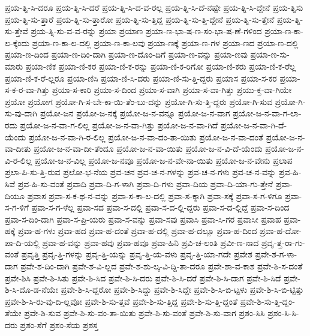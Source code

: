 {ಪ್ರಯ-ತ್ನಿ-ಸಿ-ದರೂ
ಪ್ರಯ-ತ್ನಿ-ಸಿ-ದರೆ
ಪ್ರಯ-ತ್ನಿ-ಸಿ-ದ-ವ-ರಲ್ಲ
ಪ್ರಯ-ತ್ನಿ-ಸಿ-ದೆ-ನಷ್ಟೇ
ಪ್ರಯ-ತ್ನಿ-ಸಿ-ದ್ದೇನೆ
ಪ್ರಯ-ತ್ನಿಸು
ಪ್ರಯ-ತ್ನಿ-ಸು-ತ್ತಾರೆ
ಪ್ರಯ-ತ್ನಿ-ಸು-ತ್ತಾರೋ
ಪ್ರಯ-ತ್ನಿ-ಸು-ತ್ತಿದ್ದ
ಪ್ರಯ-ತ್ನಿ-ಸು-ತ್ತಿ-ದ್ದೇನೆ
ಪ್ರಯ-ತ್ನಿ-ಸು-ತ್ತೇನೆ
ಪ್ರಯ-ತ್ನಿ-ಸು-ತ್ತೇವೆ
ಪ್ರಯ-ತ್ನಿ-ಸು-ವ-ವ-ರನ್ನು
ಪ್ರಯಾ
ಪ್ರಯಾಣ
ಪ್ರಯಾ-ಣ-ಭಾ-ಷ-ಣ-ಸಂ-ಭಾ-ಷ-ಣೆ-ಗಳಿಂದ
ಪ್ರಯಾ-ಣ-ಕಾ-ಲ-ಕ್ಕೆಂದು
ಪ್ರಯಾ-ಣ-ಕಾ-ಲ-ದಲ್ಲಿ
ಪ್ರಯಾ-ಣ-ಕಾ-ಲವು
ಪ್ರಯಾ-ಣಕ್ಕೆ
ಪ್ರಯಾ-ಣ-ಗಳ
ಪ್ರಯಾ-ಣದ
ಪ್ರಯಾ-ಣ-ದಲ್ಲಿ
ಪ್ರಯಾ-ಣ-ದಿಂದ
ಪ್ರಯಾ-ಣ-ದಿಂ-ದಾಗಿ
ಪ್ರಯಾ-ಣ-ದೊಂ-ದಿಗೆ
ಪ್ರಯಾ-ಣ-ವನ್ನು
ಪ್ರಯಾ-ಣವು
ಪ್ರಯಾ-ಣ-ಸು-ಮಾರು
ಪ್ರಯಾ-ಣಿಕ
ಪ್ರಯಾ-ಣಿ-ಕರ
ಪ್ರಯಾ-ಣಿ-ಕ-ರನ್ನು
ಪ್ರಯಾ-ಣಿ-ಕ-ರಿಗೋ
ಪ್ರಯಾ-ಣಿ-ಕರು
ಪ್ರಯಾ-ಣಿ-ಕ-ರೆಲ್ಲ
ಪ್ರಯಾ-ಣಿ-ಕ-ರೆ-ಲ್ಲರೂ
ಪ್ರಯಾ-ಣಿಸಿ
ಪ್ರಯಾ-ಣಿ-ಸಿ-ದರು
ಪ್ರಯಾ-ಣಿ-ಸು-ತ್ತಿ-ದ್ದರು
ಪ್ರಯಾಸ
ಪ್ರಯಾ-ಸ-ಕರ
ಪ್ರಯಾ-ಸ-ಕ-ರ-ವಾ-ಗಿತ್ತು
ಪ್ರಯಾ-ಸ-ಕಾರಿ
ಪ್ರಯಾ-ಸ-ದಿಂದ
ಪ್ರಯಾ-ಸ-ವಾಗಿ
ಪ್ರಯಾ-ಸ-ವಾ-ಗಿತ್ತು
ಪ್ರಯು-ಕ್ತ-ವಾ-ಗಿಯೇ
ಪ್ರಯೋ
ಪ್ರಯೋಗ
ಪ್ರಯೋ-ಗಿ-ಸ-ಬೇ-ಕಾ-ಯಿ-ತೆಂ-ಬು-ದನ್ನು
ಪ್ರಯೋ-ಗಿ-ಸು-ತ್ತಿ-ದ್ದರು
ಪ್ರಯೋ-ಗಿ-ಸುವ
ಪ್ರಯೋ-ಗಿ-ಸು-ವು-ದಾಗಿ
ಪ್ರಯೋ-ಜನ
ಪ್ರಯೋ-ಜ-ನಕ್ಕೆ
ಪ್ರಯೋ-ಜ-ನ-ವನ್ನೂ
ಪ್ರಯೋ-ಜ-ನ-ವಾಗ
ಪ್ರಯೋ-ಜ-ನ-ವಾ-ಗ-ಲಾ-ರದು
ಪ್ರಯೋ-ಜ-ನ-ವಾ-ಗ-ಲಿಲ್ಲ
ಪ್ರಯೋ-ಜ-ನ-ವಾ-ಗಿತ್ತು
ಪ್ರಯೋ-ಜ-ನ-ವಾ-ಗಿದೆ
ಪ್ರಯೋ-ಜ-ನ-ವಾ-ಗಿ-ದೆ-ಯೆಂದು
ಪ್ರಯೋ-ಜ-ನ-ವಾ-ಗಿ-ರ-ಲಿಲ್ಲ
ಪ್ರಯೋ-ಜ-ನ-ವಾ-ದಂ-ತಾ-ಯಿತು
ಪ್ರಯೋ-ಜ-ನ-ವಾ-ದಂತೆ
ಪ್ರಯೋ-ಜ-ನ-ವಾ-ದೀತು
ಪ್ರಯೋ-ಜ-ನ-ವಾ-ದೀ-ತೆಂದೂ
ಪ್ರಯೋ-ಜ-ನ-ವಾ-ಯಿತು
ಪ್ರಯೋ-ಜ-ನ-ವಿ-ದೆ-ಯೆಂದು
ಪ್ರಯೋ-ಜ-ನ-ವಿ-ರ-ಲಿಲ್ಲ
ಪ್ರಯೋ-ಜ-ನ-ವಿಲ್ಲ
ಪ್ರಯೋ-ಜ-ನವೂ
ಪ್ರಯೋ-ಜ-ನ-ವೇ-ನಾ-ಯಿತು
ಪ್ರಯೋ-ಜ-ನ-ವೇನು
ಪ್ರಲಾಪ
ಪ್ರಲಾ-ಪಿ-ಸು-ತ್ತಿ-ರುವ
ಪ್ರಲೋ-ಭ-ನೆಯ
ಪ್ರವ-ಚನ
ಪ್ರವ-ಚ-ನ-ಗಳನ್ನು
ಪ್ರವ-ಚ-ನ-ಗಳು
ಪ್ರವ-ಚ-ನ-ವನ್ನು
ಪ್ರವ-ಹಿ-ಸಿವೆ
ಪ್ರವ-ಹಿ-ಸು-ವಂತೆ
ಪ್ರವಾದಿ
ಪ್ರವಾ-ದಿ-ಗ-ಳಾಗಿ
ಪ್ರವಾ-ದಿ-ಗಳು
ಪ್ರವಾ-ದಿಯ
ಪ್ರವಾ-ದಿ-ಯಾ-ಗು-ತ್ತೇನೆ
ಪ್ರವಾ-ದಿಯೂ
ಪ್ರವಾಸ
ಪ್ರವಾ-ಸ-ಕ-ಥ-ನ-ವನ್ನು
ಪ್ರವಾ-ಸ-ಕಾ-ಲ-ದಲ್ಲಿ
ಪ್ರವಾ-ಸ-ಕ್ಕಾಗಿ
ಪ್ರವಾ-ಸಕ್ಕೆ
ಪ್ರವಾ-ಸ-ಗ-ಳಿಗೂ
ಪ್ರವಾ-ಸ-ಗ-ಳಿಗೆ
ಪ್ರವಾ-ಸ-ಗ-ಳೆಲ್ಲ
ಪ್ರವಾ-ಸದ
ಪ್ರವಾ-ಸ-ದಲ್ಲಿ
ಪ್ರವಾ-ಸ-ದ-ಲ್ಲಿ-ದ್ದರು
ಪ್ರವಾ-ಸ-ದ-ಲ್ಲಿದ್ದೆ
ಪ್ರವಾ-ಸ-ದಿಂದ
ಪ್ರವಾ-ಸ-ದಿಂ-ದಾಗಿ
ಪ್ರವಾ-ಸ-ಪ್ರಿ-ಯರು
ಪ್ರವಾ-ಸ-ವನ್ನು
ಪ್ರವಾ-ಸವು
ಪ್ರವಾಸಿ
ಪ್ರವಾ-ಸಿ-ಗರ
ಪ್ರವಾಸೀ
ಪ್ರವಾಹ
ಪ್ರವಾ-ಹಕ್ಕೆ
ಪ್ರವಾ-ಹ-ಗಳು
ಪ್ರವಾ-ಹದ
ಪ್ರವಾ-ಹ-ದಂತೆ
ಪ್ರವಾ-ಹ-ದಲ್ಲಿ
ಪ್ರವಾ-ಹ-ದಲ್ಲೂ
ಪ್ರವಾ-ಹ-ದಿಂದ
ಪ್ರವಾ-ಹ-ದೋ-ಪಾ-ದಿ-ಯಲ್ಲಿ
ಪ್ರವಾ-ಹ-ವನ್ನು
ಪ್ರವಾ-ಹವು
ಪ್ರವಾ-ಹವೂ
ಪ್ರವಾ-ಹಿನಿ
ಪ್ರವಿ-ಚ-ಲಂತಿ
ಪ್ರವೀ-ಣ-ನಾದ
ಪ್ರವೃ-ತ್ತ-ರಾ-ಗು-ವಂತೆ
ಪ್ರವೃತ್ತಿ
ಪ್ರವೃ-ತ್ತಿ-ಗಳನ್ನು
ಪ್ರವೃ-ತ್ತಿ-ಯನ್ನು
ಪ್ರವೃ-ತ್ತಿ-ಯ-ವಳು
ಪ್ರವೃ-ತ್ತಿ-ಯಾ-ಗದೇ
ಪ್ರವೇಶ
ಪ್ರವೇ-ಶ-ಗ-ಳಾ-ದಾಗ
ಪ್ರವೇ-ಶ-ದಿಂ-ದಾಗಿ
ಪ್ರವೇ-ಶ-ವಿ-ಲ್ಲದ
ಪ್ರವೇ-ಶ-ಶು-ಲ್ಕ-ವಿ-ದ್ದಿ-ತಾ-ದರೂ
ಪ್ರವೇ-ಶಾ-ವ-ಕಾಶ
ಪ್ರವೇ-ಶಿ-ಸ-ದಂತೆ
ಪ್ರವೇ-ಶಿಸಿ
ಪ್ರವೇ-ಶಿ-ಸಿತು
ಪ್ರವೇ-ಶಿ-ಸಿದ
ಪ್ರವೇ-ಶಿ-ಸಿ-ದರು
ಪ್ರವೇ-ಶಿ-ಸಿ-ದರೆ
ಪ್ರವೇ-ಶಿ-ಸಿ-ದಾಗ
ಪ್ರವೇ-ಶಿ-ಸಿದೆ
ಪ್ರವೇ-ಶಿ-ಸಿ-ದೊ-ಡ-ನೆಯೇ
ಪ್ರವೇ-ಶಿ-ಸಿ-ದ್ದರೋ
ಪ್ರವೇ-ಶಿ-ಸಿದ್ದು
ಪ್ರವೇ-ಶಿ-ಸಿದ್ದೇ
ಪ್ರವೇ-ಶಿ-ಸಿ-ಬಿ-ಟ್ಟಳು
ಪ್ರವೇ-ಶಿ-ಸಿ-ಬಿ-ಟ್ಟಿತ್ತು
ಪ್ರವೇ-ಶಿ-ಸಿ-ರು-ವು-ದಿ-ಲ್ಲವೋ
ಪ್ರವೇ-ಶಿ-ಸು-ತ್ತವೆ
ಪ್ರವೇ-ಶಿ-ಸು-ತ್ತಿದ್ದ
ಪ್ರವೇ-ಶಿ-ಸು-ತ್ತಿ-ದ್ದಂತೆ
ಪ್ರವೇ-ಶಿ-ಸು-ತ್ತಿ-ದ್ದಂ-ತೆಯೇ
ಪ್ರವೇ-ಶಿ-ಸುವ
ಪ್ರವೇ-ಶಿ-ಸು-ವಂ-ತಾ-ಯಿತು
ಪ್ರವೇ-ಶಿ-ಸು-ವಂತೆ
ಪ್ರವೇ-ಶಿ-ಸು-ವಾಗ
ಪ್ರಶಂ-ಸಿಸಿ
ಪ್ರಶಂ-ಸಿ-ಸಿ-ದರು
ಪ್ರಶಂ-ಸೆಗೆ
ಪ್ರಶಂ-ಸೆಯ
ಪ್ರಶಸ್ತ
}
